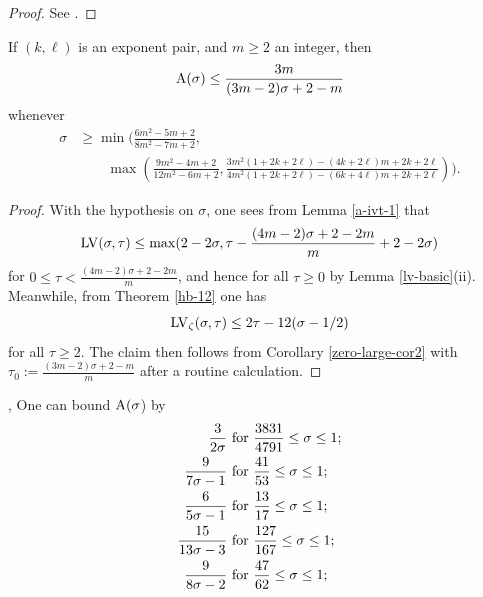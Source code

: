 \begin{proof}  See \cite[(11.74)]{ivic}.
\end{proof}

\begin{lemma}\label{gzd}\cite[(11.76), (11.77)]{ivic} If $(k,\ell)$ is an exponent pair, and $m \geq 2$ an integer, then
$$ \mathrm{A}(\sigma) \leq \frac{3m}{(3m-2)\sigma + 2 - m}$$
whenever
\begin{align*}
\sigma &\geq \min\biggl( \frac{6m^2-5m+2}{8m^2-7m+2},\\
&\qquad \max\left( \frac{9m^2-4m+2}{12m^2-6m+2}, \frac{3m^2(1+2k+2\ell)-(4k+2\ell)m + 2k+2\ell}{4m^2(1+2k+2\ell)-(6k+4\ell)m + 2k+2\ell} \right) \biggr).
\end{align*}
\end{lemma}

\begin{proof} With the hypothesis on $\sigma$, one sees from Lemma \ref{a-ivt-1} that
$$ \mathrm{LV}(\sigma,\tau) \leq \max( 2 - 2 \sigma, \tau - \frac{(4m-2)\sigma + 2-2m}{m} + 2-2\sigma)$$
for $0 \leq \tau < \frac{(4m-2)\sigma + 2-2m}{m}$, and hence for all $\tau \geq 0$ by Lemma \ref{lv-basic}(ii).  Meanwhile, from Theorem \ref{hb-12} one has
$$\mathrm{LV}_\zeta(\sigma,\tau) \leq 2\tau - 12 (\sigma-1/2)$$
for all $\tau \geq 2$.  The claim then follows from Corollary
\ref{zero-large-cor2} with $\tau_0 := \frac{(3m-2)\sigma+2-m}{m}$ after a routine calculation.
\end{proof}

\begin{corollary}\label{further_ivic_zero}\cite{ivic_exponent_pairs}, \cite[Theorem 11.4]{ivic} One can bound $\mathrm{A}(\sigma$) by
\begin{align*}
 \frac{3}{2\sigma} &\hbox{ for } \frac{3831}{4791} \leq \sigma \leq 1;\\
 \frac{9}{7\sigma-1} &\hbox{ for } \frac{41}{53} \leq \sigma \leq 1; \\
 \frac{6}{5\sigma-1} &\hbox{ for } \frac{13}{17} \leq \sigma \leq 1; \\
 \frac{15}{13\sigma-3} &\hbox{ for } \frac{127}{167} \leq \sigma \leq 1; \\
 \frac{9}{8\sigma-2} &\hbox{ for } \frac{47}{62} \leq \sigma \leq 1;
\end{align*}
\end{corollary}
\literature
{}
\derived
{}

